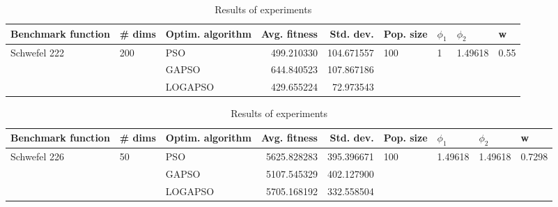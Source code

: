\documentclass{article}
\begin{document}
\begin{table}
\centering
\caption{Results of experiments}
\begin{tabular}{lllrrllll}
\toprule
           Benchmark function &              \# dims & Optim. algorithm &  Avg. fitness &  Std. dev. &            Pop. size &         $\phi_{1}$ &               $\phi_{2}$ &                     w \\
\midrule
\multirow{3}{*}{Schwefel 222} & \multirow{3}{*}{200} &              PSO &    499.210330 & 104.671557 & \multirow{3}{*}{100} & \multirow{3}{*}{1} & \multirow{3}{*}{1.49618} & \multirow{3}{*}{0.55} \\
                              &                      &            GAPSO &    644.840523 & 107.867186 &                      &                    &                          &                       \\
                              &                      &          LOGAPSO &    429.655224 &  72.973543 &                      &                    &                          &                       \\
\bottomrule
\end{tabular}
\end{table}
\begin{table}
\centering
\caption{Results of experiments}
\begin{tabular}{lllrrllll}
\toprule
           Benchmark function &             \# dims & Optim. algorithm &  Avg. fitness &  Std. dev. &            Pop. size &               $\phi_{1}$ &               $\phi_{2}$ &                       w \\
\midrule
\multirow{3}{*}{Schwefel 226} & \multirow{3}{*}{50} &              PSO &   5625.828283 & 395.396671 & \multirow{3}{*}{100} & \multirow{3}{*}{1.49618} & \multirow{3}{*}{1.49618} & \multirow{3}{*}{0.7298} \\
                              &                     &            GAPSO &   5107.545329 & 402.127900 &                      &                          &                          &                         \\
                              &                     &          LOGAPSO &   5705.168192 & 332.558504 &                      &                          &                          &                         \\
\bottomrule
\end{tabular}
\end{table}
\end{document}
